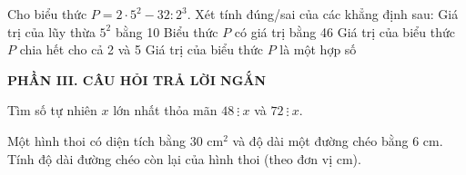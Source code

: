 \documentclass[12pt,a4paper]{article}
\begin{document}
\begin{ex}
Cho biểu thức $P = 2 \cdot 5^2 - 32 : 2^3$. Xét tính đúng/sai của các khẳng định sau:
\choiceTF
{Giá trị của lũy thừa $5^2$ bằng 10}
{\True Biểu thức $P$ có giá trị bằng 46}
{Giá trị của biểu thức $P$ chia hết cho cả 2 và 5}
{\True Giá trị của biểu thức $P$ là một hợp số}
\end{ex}


\setcounter{ex}{0}
\vspace{2mm}
\noindent\textbf{\large PHẦN III. CÂU HỎI TRẢ LỜI NGẮN}
\vspace{1mm}
\begin{ex}
Tìm số tự nhiên $x$ lớn nhất thỏa mãn $48 \ \vdots \ x$ và $72 \ \vdots \ x$. 
\end{ex}

\begin{ex}
Một hình thoi có diện tích bằng $30\text{ cm}^2$ và độ dài một đường chéo bằng $6\text{ cm}$. Tính độ dài đường chéo còn lại của hình thoi (theo đơn vị $\text{cm}$). 
\end{ex}
\end{document}
